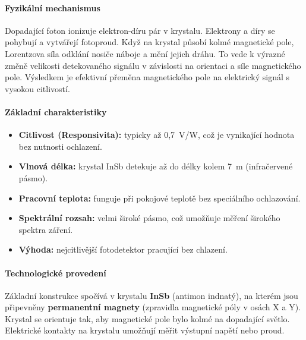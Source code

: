 \documentclass[a4paper, 12pt]{article}
\begin{document}
        \paragraph{Fyzikální mechanismus}
        Dopadající foton ionizuje elektron-díru pár v krystalu. Elektrony a díry se pohybují a vytvářejí fotoproud.
        Když na krystal působí kolmé magnetické pole, Lorentzova síla odklání nosiče náboje a mění jejich dráhu.
        To vede k výrazné změně velikosti detekovaného signálu v závislosti na orientaci a síle magnetického pole.
        Výsledkem je efektivní přeměna magnetického pole na elektrický signál s vysokou citlivostí.

        \paragraph{Základní charakteristiky}
        \begin{itemize}
            \item \textbf{Citlivost (Responsivita):} typicky až 0{,}7~V/W, což je vynikající hodnota bez nutnosti ochlazení.
            \item \textbf{Vlnová délka:} krystal InSb detekuje až do délky kolem 7~\textmu m (infračervené pásmo).
            \item \textbf{Pracovní teplota:} funguje při pokojové teplotě bez speciálního ochlazování.
            \item \textbf{Spektrální rozsah:} velmi široké pásmo, což umožňuje měření širokého spektra záření.
            \item \textbf{Výhoda:} nejcitlivější fotodetektor pracující bez chlazení.
        \end{itemize}

        \paragraph{Technologické provedení}
        Základní konstrukce spočívá v krystalu \textbf{InSb} (antimon indnatý), na kterém jsou připevněny 
        \textbf{permanentní magnety} (zpravidla magnetické póly v osách X a Y). Krystal se orientuje tak,
        aby magnetické pole bylo kolmé na dopadající světlo. Elektrické kontakty na krystalu umožňují 
        měřit výstupní napětí nebo proud.
\end{document}
